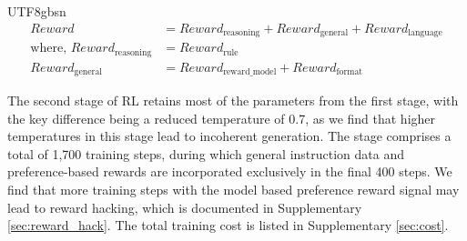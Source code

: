 \documentclass[11pt, a4paper, logo, copyright, nonumbering]{deepseek}
\begin{document}
\begin{CJK*}{UTF8}{gbsn}
\begin{align}
Reward &= Reward_{\text{reasoning}} + Reward_{\text{general}} + Reward_{\text{language}}\\
\text{where, } Reward_{\text{reasoning}} &= Reward_{\text{rule}}\\
Reward_{\text{general}} &= Reward_{\text{reward\_model}} + Reward_{\text{format}}
\end{align}

The second stage of RL retains most of the parameters from the first stage, with the key difference being a reduced temperature of 0.7, as we find that higher temperatures in this stage lead to incoherent generation. The stage comprises a total of 1,700 training steps, during which general instruction data and preference-based rewards are incorporated exclusively in the final 400 steps. We find that more training steps with the model based preference reward signal may lead to reward hacking, which is documented in Supplementary \ref{sec:reward_hack}. The total training cost is listed in Supplementary \ref{sec:cost}.


\end{CJK*}
\end{document}
